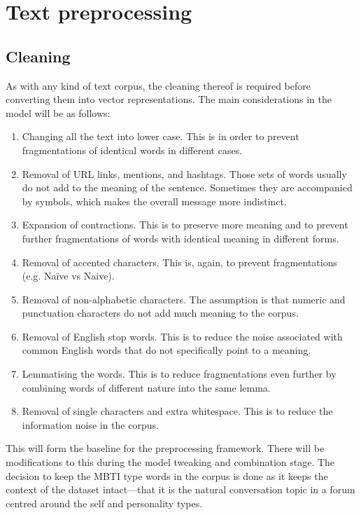\documentclass[11pt,a4paper]{article}
\begin{document}
	\section{Text preprocessing}
	
	\subsection{Cleaning}
	
	As with any kind of text corpus, the cleaning thereof is required before converting them into vector representations. The main considerations in the model will be as follows:
	
	\begin{enumerate}
		\item Changing all the text into lower case. This is in order to prevent fragmentations of identical words in different cases.
		\item Removal of URL links, mentions, and hashtags. Those sets of words usually do not add to the meaning of the sentence. Sometimes they are accompanied by symbols, which makes the overall message more indistinct.
		\item Expansion of contractions. This is to preserve more meaning and to prevent further fragmentations of words with identical meaning in different forms.
		\item Removal of accented characters. This is, again, to prevent fragmentations (e.g. Naïve vs Naive).
		\item Removal of non-alphabetic characters. The assumption is that numeric and punctuation characters do not add much meaning to the corpus.
		\item Removal of English stop words. This is to reduce the noise associated with common English words that do not specifically point to a meaning.
		\item Lemmatising the words. This is to reduce fragmentations even further by combining words of different nature into the same lemma.
		\item Removal of single characters and extra whitespace. This is to reduce the information noise in the corpus.
	\end{enumerate}

	This will form the baseline for the preprocessing framework. There will be modifications to this during the model tweaking and combination stage. The decision to keep the MBTI type words in the corpus is done as it keeps the context of the dataset intact---that it is the natural conversation topic in a forum centred around the self and personality types.
	
\end{document}

